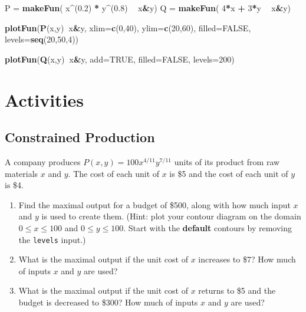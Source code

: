\documentclass[
]{book}
\newenvironment{Shaded}{\begin{snugshade}}{\end{snugshade}}
\newcommand{\DataTypeTok}[1]{\textcolor[rgb]{0.13,0.29,0.53}{#1}}
\newcommand{\DecValTok}[1]{\textcolor[rgb]{0.00,0.00,0.81}{#1}}
\newcommand{\FloatTok}[1]{\textcolor[rgb]{0.00,0.00,0.81}{#1}}
\newcommand{\KeywordTok}[1]{\textcolor[rgb]{0.13,0.29,0.53}{\textbf{#1}}}
\newcommand{\NormalTok}[1]{#1}
\newcommand{\OperatorTok}[1]{\textcolor[rgb]{0.81,0.36,0.00}{\textbf{#1}}}
\newcommand{\OtherTok}[1]{\textcolor[rgb]{0.56,0.35,0.01}{#1}}
\newcommand{\StringTok}[1]{\textcolor[rgb]{0.31,0.60,0.02}{#1}}
\begin{document}
\begin{Shaded}
\begin{Highlighting}[]
\NormalTok{P =}\StringTok{ }\KeywordTok{makeFun}\NormalTok{( x}\OperatorTok{^}\NormalTok{(}\FloatTok{0.2}\NormalTok{) }\OperatorTok{*}\StringTok{ }\NormalTok{y}\OperatorTok{^}\NormalTok{(}\FloatTok{0.8}\NormalTok{) }\OperatorTok{~}\StringTok{ }\NormalTok{x}\OperatorTok{&}\NormalTok{y)}
\NormalTok{Q =}\StringTok{ }\KeywordTok{makeFun}\NormalTok{( }\DecValTok{4}\OperatorTok{*}\NormalTok{x }\OperatorTok{+}\StringTok{ }\DecValTok{3}\OperatorTok{*}\NormalTok{y }\OperatorTok{~}\StringTok{ }\NormalTok{x}\OperatorTok{&}\NormalTok{y)}

\KeywordTok{plotFun}\NormalTok{(}\KeywordTok{P}\NormalTok{(x,y)}\OperatorTok{~}\NormalTok{x}\OperatorTok{&}\NormalTok{y, }\DataTypeTok{xlim=}\KeywordTok{c}\NormalTok{(}\DecValTok{0}\NormalTok{,}\DecValTok{40}\NormalTok{), }\DataTypeTok{ylim=}\KeywordTok{c}\NormalTok{(}\DecValTok{20}\NormalTok{,}\DecValTok{60}\NormalTok{), }\DataTypeTok{filled=}\OtherTok{FALSE}\NormalTok{, }\DataTypeTok{levels=}\KeywordTok{seq}\NormalTok{(}\DecValTok{20}\NormalTok{,}\DecValTok{50}\NormalTok{,}\DecValTok{4}\NormalTok{))}

\KeywordTok{plotFun}\NormalTok{(}\KeywordTok{Q}\NormalTok{(x,y)}\OperatorTok{~}\NormalTok{x}\OperatorTok{&}\NormalTok{y, }\DataTypeTok{add=}\OtherTok{TRUE}\NormalTok{, }\DataTypeTok{filled=}\OtherTok{FALSE}\NormalTok{, }\DataTypeTok{levels=}\DecValTok{200}\NormalTok{)}
\end{Highlighting}
\end{Shaded}

\hypertarget{activities-20}{%
\section{Activities}\label{activities-20}}

\hypertarget{constrained-production}{%
\subsection{Constrained Production}\label{constrained-production}}

A company produces \(P(x,y) = 100 x^{4/11} y^{7/11}\) units of its product from raw materials \(x\) and \(y\). The cost of each unit of \(x\) is \$5 and the cost of each unit of \(y\) is \$4.

\begin{enumerate}
\def\labelenumi{\arabic{enumi}.}
\item
  Find the maximal output for a budget of \$500, along with how much input \(x\) and \(y\) is used to create them. (Hint: plot your contour diagram on the domain \(0 \leq x \leq 100\) and \(0 \leq y \leq 100\). Start with the \textbf{default} contours by removing the \texttt{levels} input.)
\item
  What is the maximal output if the unit cost of \(x\) increases to \$7? How much of inputs \(x\) and \(y\) are used?
\item
  What is the maximal output if the unit cost of \(x\) returns to \$5 and the budget is decreased to \$300? How much of inputs \(x\) and \(y\) are used?
\end{enumerate}
\end{document}

